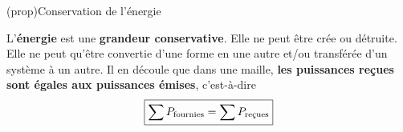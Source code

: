 \documentclass[../../main/main.tex]{subfiles}
\begin{document}
\begin{tcb}[label=prop:puiss](prop){Conservation de l'énergie}

	L'\textbf{énergie} est une \textbf{grandeur conservative}. Elle ne peut être
	crée ou détruite. Elle ne peut qu'être convertie d'une forme en une autre
	et/ou transférée d'un système à un autre. Il en découle que dans une maille,
	\textbf{les puissances reçues sont égales aux puissances émises},
	c'est-à-dire
	\[\boxed{\sum P_{\rm fournies} = \sum P_{\text{reçues}}}\]
\end{tcb}
\end{document}
